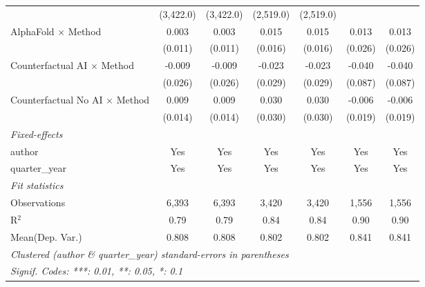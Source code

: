 \begin{tabular}{lcccccc}
                                         & (3,422.0)      & (3,422.0)      & (2,519.0)     & (2,519.0)     &                &   \\   
   AlphaFold $\times$ Method             & 0.003          & 0.003          & 0.015         & 0.015         & 0.013          & 0.013\\   
                                         & (0.011)        & (0.011)        & (0.016)       & (0.016)       & (0.026)        & (0.026)\\   
   Counterfactual AI $\times$ Method     & -0.009         & -0.009         & -0.023        & -0.023        & -0.040         & -0.040\\   
                                         & (0.026)        & (0.026)        & (0.029)       & (0.029)       & (0.087)        & (0.087)\\   
   Counterfactual No AI $\times$ Method  & 0.009          & 0.009          & 0.030         & 0.030         & -0.006         & -0.006\\   
                                         & (0.014)        & (0.014)        & (0.030)       & (0.030)       & (0.019)        & (0.019)\\   
   \midrule
   \emph{Fixed-effects}\\
   author                                & Yes            & Yes            & Yes           & Yes           & Yes            & Yes\\  
   quarter\_year                         & Yes            & Yes            & Yes           & Yes           & Yes            & Yes\\  
   \midrule
   \emph{Fit statistics}\\
   Observations                          & 6,393          & 6,393          & 3,420         & 3,420         & 1,556          & 1,556\\  
   R$^2$                                 & 0.79           & 0.79           & 0.84          & 0.84          & 0.90           & 0.90\\  
Mean(Dep. Var.) & 0.808 & 0.808 & 0.802 & 0.802 & 0.841 & 0.841 \\
   \midrule \midrule
   \multicolumn{7}{l}{\emph{Clustered (author \& quarter\_year) standard-errors in parentheses}}\\
   \multicolumn{7}{l}{\emph{Signif. Codes: ***: 0.01, **: 0.05, *: 0.1}}\\
\end{tabular}
\par\endgroup
